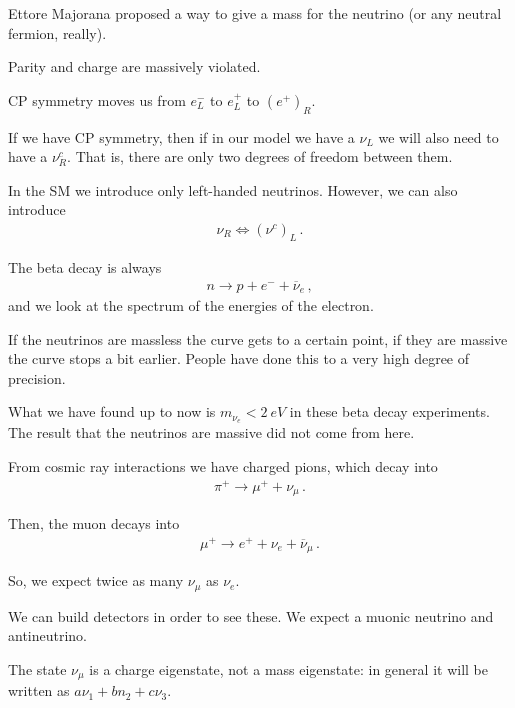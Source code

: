 \documentclass[main.tex]{subfiles}
\begin{document}
Ettore Majorana proposed a way to give a mass for the neutrino (or any neutral fermion, really).



Parity and charge are massively violated.

CP symmetry moves us from \(e^{-}_{L}\) to \(e^{+}_{L}\) to \((e^{+})_{R}\).

If we have CP symmetry, then if in our model we have a \(\nu_{L}\) we will also need to have a \(\nu^{c}_{R}\).
That is, there are only two degrees of freedom between them.

In the SM we introduce only left-handed neutrinos. However, we can also introduce 
%
\begin{align}
\nu_{R} \iff (\nu^{c})_{L}
\,.
\end{align}

The beta decay is always 
%
\begin{align}
n \to p + e^{-} + \overline{\nu}_{e}
\,,
\end{align}
%
and we look at the spectrum of the energies of the electron. 

If the neutrinos are massless the curve gets to a certain point, if they are massive the curve stops a bit earlier. 
People have done this to a very high degree of precision.

What we have found up to now is \(m_{\nu_{e}} < \SI{2}{eV}\) in these beta decay experiments. 
The result that the neutrinos are massive did not come from here. 

From cosmic ray interactions we have charged pions, which decay into 
%
\begin{align}
\pi^{+} \to \mu^+ + \nu_{\mu }
\,.
\end{align}

Then, the muon decays into 
%
\begin{align}
\mu^+ \to e^{+} + \nu_{e} + \overline{\nu}_{\mu }
\,.
\end{align}

So, we expect twice as many \(\nu_{\mu }\) as \(\nu_{e}\).

We can build detectors in order to see these. We expect a muonic neutrino and antineutrino. 

The state \(\nu_{\mu }\) is a charge eigenstate, not a mass eigenstate: in general it will be written as \(a \nu_1 + b n_2 +c \nu_3 \).
\end{document}

